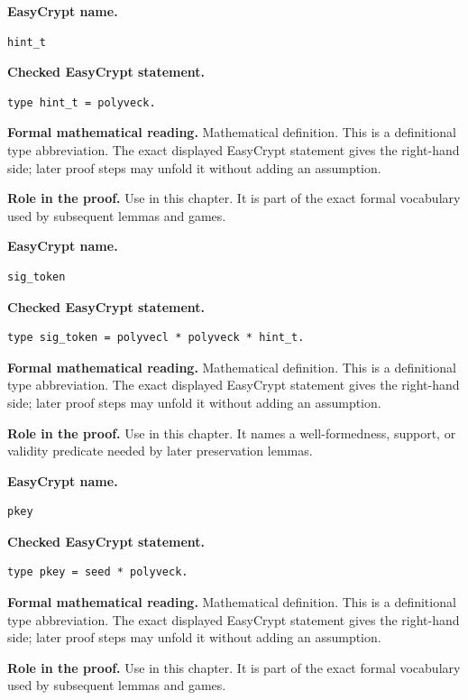 \begin{formaldefinition}
\noindent\textbf{EasyCrypt name.}
\begin{lstlisting}[language=EasyCrypt,basicstyle=\ttfamily\scriptsize]
hint_t
\end{lstlisting}
\noindent\textbf{Checked EasyCrypt statement.}
\begin{lstlisting}[language=EasyCrypt,basicstyle=\ttfamily\scriptsize]
type hint_t = polyveck.
\end{lstlisting}
\noindent\textbf{Formal mathematical reading.}
Mathematical definition. This is a definitional type abbreviation.  The exact displayed EasyCrypt statement gives the right-hand side; later proof steps may unfold it without adding an assumption.

\noindent\textbf{Role in the proof.}
Use in this chapter. It is part of the exact formal vocabulary used by subsequent lemmas and games.

\end{formaldefinition}

\begin{formaldefinition}
\noindent\textbf{EasyCrypt name.}
\begin{lstlisting}[language=EasyCrypt,basicstyle=\ttfamily\scriptsize]
sig_token
\end{lstlisting}
\noindent\textbf{Checked EasyCrypt statement.}
\begin{lstlisting}[language=EasyCrypt,basicstyle=\ttfamily\scriptsize]
type sig_token = polyvecl * polyveck * hint_t.
\end{lstlisting}
\noindent\textbf{Formal mathematical reading.}
Mathematical definition. This is a definitional type abbreviation.  The exact displayed EasyCrypt statement gives the right-hand side; later proof steps may unfold it without adding an assumption.

\noindent\textbf{Role in the proof.}
Use in this chapter. It names a well-formedness, support, or validity predicate needed by later preservation lemmas.

\end{formaldefinition}

\begin{formaldefinition}
\noindent\textbf{EasyCrypt name.}
\begin{lstlisting}[language=EasyCrypt,basicstyle=\ttfamily\scriptsize]
pkey
\end{lstlisting}
\noindent\textbf{Checked EasyCrypt statement.}
\begin{lstlisting}[language=EasyCrypt,basicstyle=\ttfamily\scriptsize]
type pkey = seed * polyveck.
\end{lstlisting}
\noindent\textbf{Formal mathematical reading.}
Mathematical definition. This is a definitional type abbreviation.  The exact displayed EasyCrypt statement gives the right-hand side; later proof steps may unfold it without adding an assumption.

\noindent\textbf{Role in the proof.}
Use in this chapter. It is part of the exact formal vocabulary used by subsequent lemmas and games.

\end{formaldefinition}

